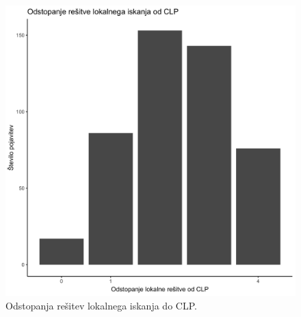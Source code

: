 \documentclass[a4paper, 12pt]{article}
\begin{document}
\begin{figure}[h!]
	\begin{center}
		\includegraphics[scale=0.12]{R_koda/pon-napake.png}
		\caption{Odstopanja rešitev lokalnega iskanja do CLP.}
	\end{center}
\end{figure}
\end{document}

